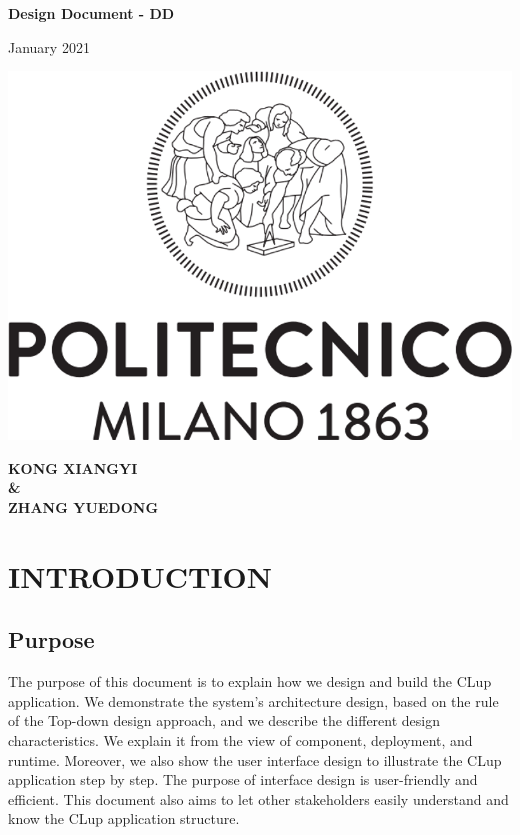 \documentclass[a4paper,12pt]{report}
\begin{document}
\begin{titlepage}
	\begin{center}
		\vspace*{1cm}

		\Huge
		\textbf{Design Document - DD}

		\vspace{0.5cm}
		\large
		January 2021

		\vspace{1.5cm}


		\vfill

		\includegraphics[scale=0.7]{PolimiLogo}

		\vfill


		\normalsize
		\textbf{KONG XIANGYI} \\
		\textbf{\&} \\
		\textbf{ZHANG YUEDONG}

	\end{center}
\end{titlepage}

\tableofcontents


\chapter{INTRODUCTION}\label{ch:introduction}

\section{Purpose}

The purpose of this document is to explain how we design and build the CLup application.
We demonstrate the system's architecture design, based on the rule of the Top-down design approach, and we describe the different design characteristics.
We explain it from the view of component, deployment, and runtime.
Moreover, we also show the user interface design to illustrate the CLup application step by step.
The purpose of interface design is user-friendly and efficient.
This document also aims to let other stakeholders easily understand and know the CLup application structure.
\end{document}

